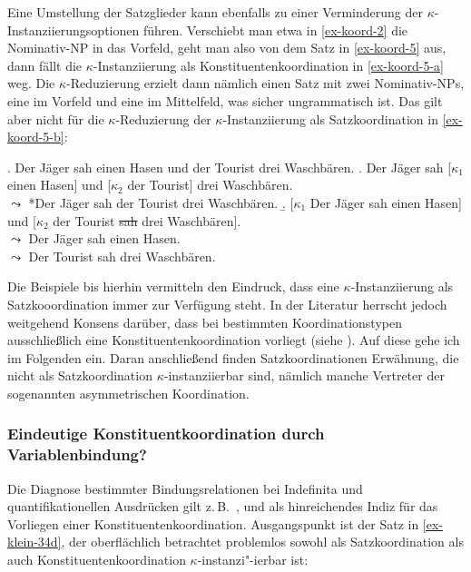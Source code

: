 Eine Umstellung der Satzglieder kann ebenfalls zu einer Verminderung der $\kappa$-Instanziierungs\-optionen führen. Verschiebt man etwa in \ref{ex-koord-2} die Nominativ-NP in das Vorfeld, geht man also von dem Satz in \ref{ex-koord-5} aus, dann fällt die $\kappa$-Instanziierung als Konstituentenkoordination in \ref{ex-koord-5-a} weg. Die $\kappa$-Reduzierung erzielt dann nämlich einen Satz mit zwei Nominativ-NPs, eine im Vorfeld und eine im Mittelfeld, was sicher ungrammatisch ist. Das gilt aber nicht für die $\kappa$-Reduzierung der $\kappa$-Instanziierung als Satzkoordination in \ref{ex-koord-5-b}:

\ex. \label{ex-koord-5} Der Jäger sah einen Hasen und der Tourist drei Waschbären.
\a. \label{ex-koord-5-a} Der Jäger sah [$\kappa_1$ einen Hasen] und [$\kappa_2$ der Tourist] drei Waschbären. \\
$\leadsto$ *Der Jäger sah der Tourist drei Waschbären.
\b. \label{ex-koord-5-b} [$\kappa_1$ Der Jäger sah einen Hasen] und [$\kappa_2$ der Tourist \sout{sah} drei Waschbären]. \\  
$\leadsto$ Der Jäger sah einen Hasen. \\
$\leadsto$ Der Tourist sah drei Waschbären.

Die Beispiele bis hierhin vermitteln den Eindruck, dass eine $\kappa$-Instanziierung als Satzkooordination immer zur Verfügung steht. In der Literatur herrscht jedoch weitgehend Konsens darüber, dass bei bestimmten Koordinationstypen ausschlie\ss lich eine Konstituentenkoordination vorliegt (siehe \citealt[Abschnitt~2.3]{Hartmann:00}). Auf diese gehe ich im Folgenden ein. Daran anschlie\ss end finden Satzkoordinationen Erwähnung, die nicht als Satzkoordination $\kappa$-instanziierbar sind, nämlich manche Vertreter der sogenannten asymmetrischen Koordination.   


\subsubsection*{Eindeutige Konstituentkoordination durch Variablenbindung?}

Die Diagnose bestimmter Bindungsrelationen bei Indefinita und quantifikationellen Ausdrü\-cken gilt z.\,B.\  \citet[773]{Klein:93}, \citet[33ff]{Hartmann:00} und \citet[31ff]{Reich:09} als hinreichendes Indiz für das Vorliegen einer Konstituentenkoordination. Ausgangspunkt ist der Satz in \ref{ex-klein-34d}, der oberflächlich betrachtet problemlos sowohl als Satzkoordination als auch Konstituentenkoordination $\kappa$-instanzi"-ierbar ist: 

